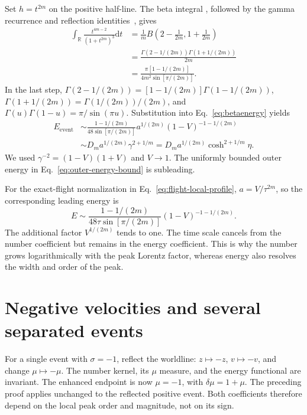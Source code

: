 \documentclass[11pt]{article}
\newcommand{\dd}{\mathrm d}
\newcommand{\R}{\mathbb R}
\begin{document}
Set $h=t^{2m}$ on the positive half-line. The beta integral
\cite[Eqs.~5.12.1 and 5.12.3]{DLMF}, followed by the gamma recurrence and reflection
identities~\cite[Eqs.~5.5.1 and 5.5.3]{DLMF}, gives
\begin{align}
 \int_\R\frac{t^{4m-2}}{(1+t^{2m})^3}\dd t
 &=\frac1m B\left(2-\frac1{2m},1+\frac1{2m}\right)\nonumber\\
 &=\frac{\Gamma(2-1/(2m))\Gamma(1+1/(2m))}{2m}
       \nonumber\\
 &=\frac{\pi[1-1/(2m)]}{4m^2\sin[\pi/(2m)]}.
 \label{eq:local-energy-beta}
\end{align}
In the last step,
$\Gamma(2-1/(2m))=[1-1/(2m)]\Gamma(1-1/(2m))$,
$\Gamma(1+1/(2m))=\Gamma(1/(2m))/(2m)$, and
$\Gamma(u)\Gamma(1-u)=\pi/\sin(\pi u)$.
Substitution into Eq.~\eqref{eq:betaenergy} yields
\begin{align}
 E_{\mathrm{event}}&\sim\frac{1-1/(2m)}{48\sin[\pi/(2m)]}
          a^{1/(2m)}(1-V)^{-1-1/(2m)}\nonumber\\
    &\sim D_m a^{1/(2m)}\gamma^{2+1/m}
     =D_m a^{1/(2m)}\cosh^{2+1/m}\eta.
 \label{eq:one-event-energy}
\end{align}
We used $\gamma^{-2}=(1-V)(1+V)$ and $V\to1$.
The uniformly bounded outer energy in
Eq.~\eqref{eq:outer-energy-bound} is subleading.

For the exact-flight normalization in Eq.~\eqref{eq:flight-local-profile},
$a=V/\tau^{2m}$, so the corresponding leading energy is
\begin{equation}
 E\sim\frac{1-1/(2m)}{48\tau\sin[\pi/(2m)]}
                 (1-V)^{-1-1/(2m)}.
 \label{eq:main-energy-coefficient}
\end{equation}
The additional factor $V^{1/(2m)}$ tends to one.
The time scale cancels from the number coefficient but remains in
the energy coefficient. This is why the number grows logarithmically
with the peak Lorentz factor, whereas energy also resolves the
width and order of the peak.

\section{Negative velocities and several separated events}

For a single event with $\sigma=-1$, reflect the worldline:
$z\mapsto-z$, $v\mapsto-v$, and change $\mu\mapsto-\mu$.
The number kernel, its $\mu$ measure, and the energy functional
are invariant. The enhanced endpoint is now $\mu=-1$, with
$\delta\mu=1+\mu$. The preceding proof applies unchanged to the
reflected positive event. Both coefficients therefore depend on
the local peak order and magnitude, not on its sign.
\end{document}
